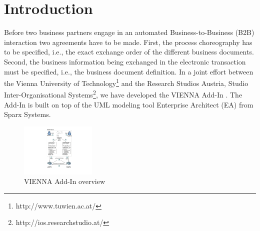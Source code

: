 \documentclass{acm_proc_article-sp}
\begin{document}
\section{Introduction}
Before two business partners engage in an automated Business-to-Business (B2B) interaction two agreements have to be made. First, the process choreography has to be specified, i.e., the exact exchange order of the different business documents. Second, the business information being exchanged in the electronic transaction must be specified, i.e., the business document definition. In a joint effort between the Vienna University of Technology\footnote{http://www.tuwien.ac.at/} and the Research Studios Austria, Studio Inter-Organisational Systems\footnote{http://ios.researchstudio.at/}, we have developed the VIENNA Add-In \cite{man:VIENNAAddIn}. The Add-In is built on top of the UML modeling tool Enterprise Architect (EA) from Sparx Systems. %
\begin{figure}[htbp]
 \centering
   \includegraphics[width=0.32\textwidth]{figures/addinoverview.pdf}
 \caption{VIENNA Add-In overview}
 \label{fig:viennaaddinoverview}
\end{figure}
\end{document}
